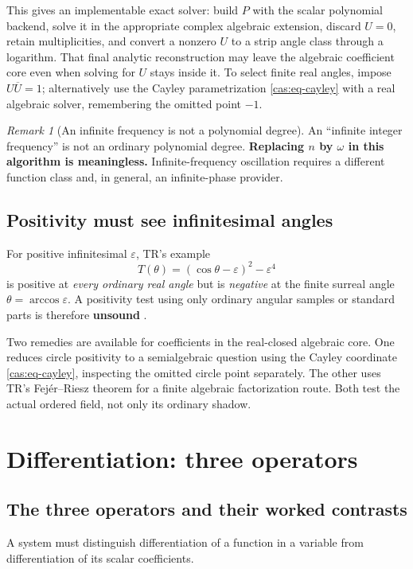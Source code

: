 \documentclass[11pt,letterpaper]{article}
\numberwithin{equation}{section}
\theoremstyle{definition}
\theoremstyle{remark}
\newtheorem{remark}[theorem]{Remark}
\begin{document}
This gives an implementable exact solver: build $P$ with the scalar polynomial
backend, solve it in the appropriate complex algebraic extension, discard
$U=0$, retain multiplicities, and convert a nonzero $U$ to a strip angle class
through a logarithm. That final analytic reconstruction may leave the algebraic
coefficient core even when solving for $U$ stays inside it. To select finite
real angles, impose $U\overline U=1$; alternatively use the Cayley
parametrization \eqref{cas:eq-cayley} with a real algebraic solver, remembering
the omitted point $-1$.

\begin{remark}[An infinite frequency is not a polynomial degree]
\label{cas:rem-infinitefreq}
An ``infinite integer frequency'' is not an ordinary polynomial degree.
\textbf{Replacing $n$ by $\omega$ in this algorithm is meaningless.}
Infinite-frequency oscillation requires a different function class and, in
general, an infinite-phase provider.
\end{remark}

\subsection{Positivity must see infinitesimal angles}
\label{cas:sub-positivity}
For positive infinitesimal $\varepsilon$, TR's example
\begin{equation}\label{cas:eq-positivity}
 T(\theta)=(\cos\theta-\varepsilon)^2-\varepsilon^4
\end{equation}
is positive at \emph{every ordinary real angle} but is \emph{negative} at the
finite surreal angle $\theta=\arccos\varepsilon$. A positivity test using only
ordinary angular samples or standard parts is therefore \textbf{unsound}
\cite{cas:SourceTrig}.

Two remedies are available for coefficients in the real-closed algebraic core.
One reduces circle positivity to a semialgebraic question using the Cayley
coordinate \eqref{cas:eq-cayley}, inspecting the omitted circle point
separately. The other uses TR's Fej\'er--Riesz theorem for a finite algebraic
factorization route. Both test the actual ordered field, not only its ordinary
shadow.

\section{Differentiation: three operators}
\label{cas:sec-derivatives}

\subsection{The three operators and their worked contrasts}
\label{cas:sub-threederivatives}
A system must distinguish differentiation of a function in a variable from
differentiation of its scalar coefficients.
\end{document}
